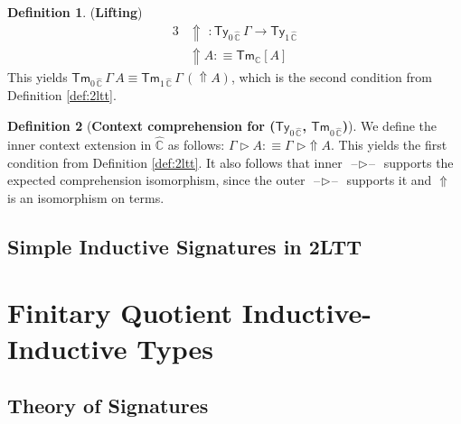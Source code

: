 \documentclass[12pt,a4paper,twoside,openany]{book}
\theoremstyle{remark}
\theoremstyle{definition}
\newtheorem{mydefinition}{Definition}
\newcommand{\mbb}[1]{\mathbb{#1}}
\newcommand{\mbf}[1]{\mathbf{#1}}
\newcommand{\Tm}{\mathsf{Tm}}
\newcommand{\Ty}{\mathsf{Ty}}
\newcommand{\blank}{\mathord{\hspace{1pt}\text{--}\hspace{1pt}}}
\newcommand{\Lift}{\Uparrow}
\newcommand{\ext}{\triangleright}
\newcommand{\mbbC}{\mbb{C}}
\newcommand{\hmbbC}{\hat{\mbb{C}}}
\newcommand{\defn}{:\equiv}
\begin{document}
\begin{mydefinition}(\textbf{Lifting})
\begin{alignat*}{3}
  & \Lift\,\,: \Ty_{0\,\hmbbC}\,\Gamma \to \Ty_{1\,\hmbbC} \\
  & \Lift\!A \defn \Tm_{\mbbC}[A]
\end{alignat*}
This yields $\Tm_{0\,\hmbbC}\,\Gamma\,A \equiv
\Tm_{1\,\hmbbC}\,\Gamma\,(\Lift\!A)$, which is the second condition from
Definition \ref{def:2ltt}.
\end{mydefinition}

\begin{mydefinition}[\textbf{Context comprehension for ($\Ty_{0\,\hmbbC}$, $\Tm_{0\,\hmbbC}$)}]
We define the inner context extension in $\hmbbC$ as follows: $\Gamma \ext A
\defn \Gamma\,\,\ext\Lift\!A$. This yields the first condition from Definition
\ref{def:2ltt}. It also follows that inner $\blank\ext\blank$ supports the
expected comprehension isomorphism, since the outer $\blank\ext\blank$ supports
it and $\Lift$ is an isomorphism on terms.
\end{mydefinition}




\section{Simple Inductive Signatures in 2LTT}




























\chapter{Finitary Quotient Inductive-Inductive Types}
\label{chap:fqiit}

\section{Theory of Signatures}
\label{sec:fqiit-tos}
\end{document}
